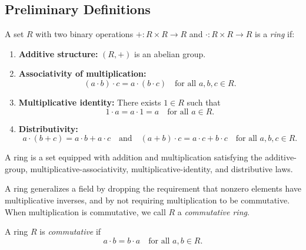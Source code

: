 
\subsection{Preliminary Definitions}

\begin{definition}[Ring]
\label{def:algebraic-geometry-ring}
A set $R$ with two binary operations $+ : R \times R \to R$
and $\cdot : R \times R \to R$ is a \emph{ring} if:

\begin{enumerate}
\item \textbf{Additive structure:}
$(R, +)$ is an abelian group.

\item \textbf{Associativity of multiplication:}
\[
(a \cdot b) \cdot c = a \cdot (b \cdot c)
\quad \text{for all } a,b,c \in R.
\]

\item \textbf{Multiplicative identity:}
There exists $1 \in R$ such that
\[
1 \cdot a = a \cdot 1 = a
\quad \text{for all } a \in R.
\]

\item \textbf{Distributivity:}
\[
a \cdot (b + c) = a \cdot b + a \cdot c
\quad \text{and} \quad
(a + b) \cdot c = a \cdot c + b \cdot c
\quad \text{for all } a,b,c \in R.
\]
\end{enumerate}
\end{definition}

\begin{remark*}
A ring is a set equipped with addition and multiplication satisfying the
additive-group, multiplicative-associativity, multiplicative-identity, and
distributive laws.
\end{remark*}

\begin{remark*}[Interpretation]
A ring generalizes a field by dropping the requirement that
nonzero elements have multiplicative inverses,
and by not requiring multiplication to be commutative.
When multiplication is commutative, we call $R$ a
\emph{commutative ring}.
\end{remark*}

\begin{definition}
\label{def:algebraic-geometry-commutative-ring}
A ring $R$ is \emph{commutative} if
\[
a \cdot b = b \cdot a
\quad \text{for all } a, b \in R.
\]
\end{definition}

